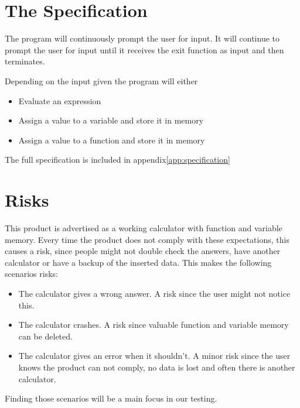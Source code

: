 \documentclass[11pt,a4paper]{article}
\begin{document}
\section{The Specification}


The program will continuously prompt the user for input. It will
continue to prompt the user for input until it receives the exit
function as input and then terminates.

Depending on the input given the program will either

\begin{itemize}
\item Evaluate an expression
\item Assign a value to a variable and store it in memory
\item Assign a value to a function and store it in memory
\end{itemize}
The full specification is included in appendix\ref{app:specification}

\section{Risks}
This product is advertised as a working calculator with function and variable memory. Every time the product does not comply with these expectations, this causes a risk, since people might not double check the answers, have another calculator or have a backup of the inserted data. This makes the following scenarios risks:
\begin{itemize}
	\item The calculator gives a wrong answer. A risk since the user might not notice this.
	\item The calculator crashes. A risk since valuable function and variable memory can be deleted.
	\item The calculator gives an error when it shouldn't. A minor risk since the user knows the product can not comply, no data is lost and often there is another calculator.
\end{itemize}
Finding those scenarios will be a main focus in our testing.
\end{document}
